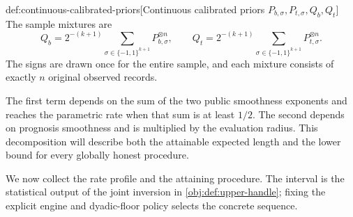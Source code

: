 \documentclass[11pt]{article}
\begin{document}
\begin{definitionv}{def:continuous-calibrated-priors}[Continuous calibrated priors \(P_{b,\sigma},P_{t,\sigma},Q_b,Q_t\)]
The sample mixtures are
\[
Q_b
=
2^{-(k+1)}
\sum_{\sigma\in\{-1,1\}^{k+1}}
P_{b,\sigma}^{\otimes n},
\qquad
Q_t
=
2^{-(k+1)}
\sum_{\sigma\in\{-1,1\}^{k+1}}
P_{t,\sigma}^{\otimes n}.
\]
The signs are drawn once for the entire sample, and each mixture consists of exactly \(n\) original observed records.
\end{definitionv}


The first term depends on the sum of the two public smoothness exponents and reaches the parametric rate when that sum is at least \(1/2\). The second depends on prognosis smoothness and is multiplied by the evaluation radius. This decomposition will describe both the attainable expected length and the lower bound for every globally honest procedure.

We now collect the rate profile  and the attaining procedure. The interval  is the statistical output of the joint inversion in \cref{obj:def:upper-handle}; fixing the explicit engine and dyadic-floor policy selects the concrete sequence.
\end{document}
